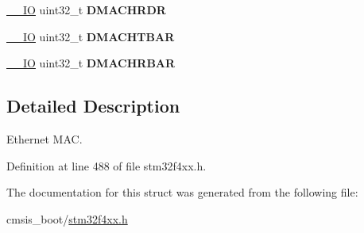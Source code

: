 \begin{DoxyCompactItemize}
\item 
\mbox{\label{struct_e_t_h___type_def_a9c49de2e699886d6604fd2b3d376a0e9}} 
\hyperlink{group___c_m_s_i_s__core__definitions_gaec43007d9998a0a0e01faede4133d6be}{\+\_\+\+\_\+\+IO} uint32\+\_\+t {\bfseries D\+M\+A\+C\+H\+R\+DR}
\item 
\mbox{\label{struct_e_t_h___type_def_a900f9f888342fbdd8ee07e3ee1d4b73c}} 
\hyperlink{group___c_m_s_i_s__core__definitions_gaec43007d9998a0a0e01faede4133d6be}{\+\_\+\+\_\+\+IO} uint32\+\_\+t {\bfseries D\+M\+A\+C\+H\+T\+B\+AR}
\item 
\mbox{\label{struct_e_t_h___type_def_acf3f7ecbf774d8d505655ac7f24761fc}} 
\hyperlink{group___c_m_s_i_s__core__definitions_gaec43007d9998a0a0e01faede4133d6be}{\+\_\+\+\_\+\+IO} uint32\+\_\+t {\bfseries D\+M\+A\+C\+H\+R\+B\+AR}
\end{DoxyCompactItemize}


\subsection{Detailed Description}
Ethernet M\+AC. 

Definition at line 488 of file stm32f4xx.\+h.



The documentation for this struct was generated from the following file\+:\begin{DoxyCompactItemize}
\item 
cmsis\+\_\+boot/\hyperlink{stm32f4xx_8h}{stm32f4xx.\+h}\end{DoxyCompactItemize}
